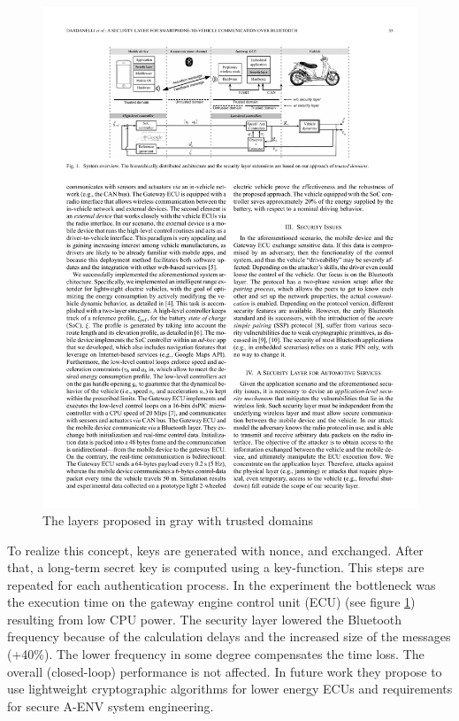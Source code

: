 \documentclass[12pt,a4paper]{article}
\begin{document}
\begin{figure}[h]
\begin{center}
	\includegraphics{img/security_layer_bt}
\caption{The layers proposed in gray with trusted domains \cite{DBLP:journals/esl/DardanelliMTZSKH13}}
\label{img_security_layer_bt}
\end{center}
\end{figure}

To realize this concept, keys are generated with nonce, and exchanged. After that, a long-term secret key is computed using a key-function. This steps are repeated for each authentication process. In the experiment the bottleneck was the execution time on the gateway engine control unit (ECU) (see figure \ref{img_security_layer_bt}) resulting from low CPU power. The security layer lowered the Bluetooth frequency because of the calculation delays and the increased size of the messages (+40\%). The lower frequency in some degree compensates the time loss. The overall (closed-loop) performance is not affected. In future work they propose to use lightweight cryptographic algorithms for lower energy ECUs and requirements for secure A-ENV system engineering.
\end{document}
